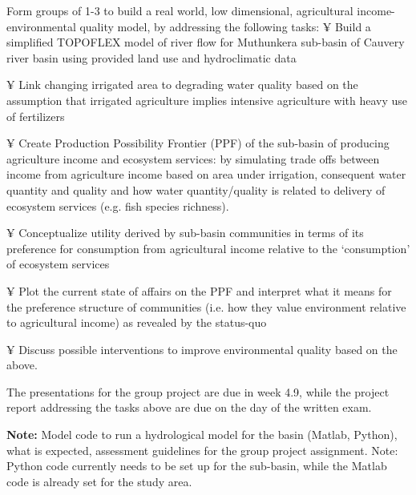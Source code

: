 

Form groups of 1-3 to build a real world, low dimensional, agricultural income-environmental quality model, by addressing the following tasks:
¥	Build a simplified TOPOFLEX model of river flow for Muthunkera sub-basin of Cauvery river basin using provided land use and hydroclimatic data

¥	Link changing irrigated area to degrading water quality based on the assumption that irrigated agriculture implies intensive agriculture with heavy use of fertilizers

¥	Create Production Possibility Frontier (PPF) of the sub-basin of producing agriculture income and ecosystem services: by simulating trade offs between income from agriculture income based on area under irrigation, consequent water quantity and quality and  how water quantity/quality is related to delivery of ecosystem services (e.g. fish species richness).

¥	Conceptualize  utility derived by sub-basin communities in terms of its preference for consumption from agricultural income relative to the ‘consumption’ of ecosystem services

¥	Plot the current state of affairs on the PPF and interpret what it means for the preference structure of communities (i.e. how they value environment relative to agricultural income) as revealed by the status-quo 

¥	Discuss possible interventions to improve environmental quality based on the above. 

The presentations for the group project are due in week 4.9, while the project report addressing the tasks above are due on the day of the written exam. 



\textbf{Note:} Model code to run a hydrological model for the basin (Matlab, Python), what is expected, assessment guidelines for the group project assignment.  Note: Python code currently needs to be set up for the sub-basin, while the Matlab code is already set for the study area. 